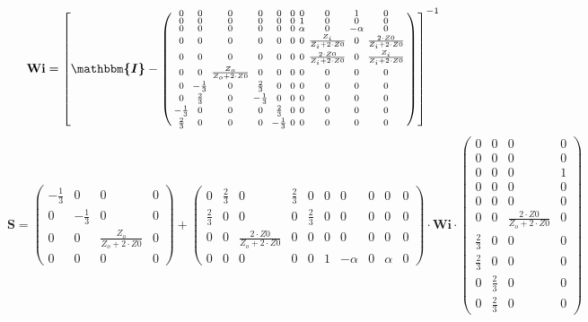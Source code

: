 \[ \mathbf{Wi} =  \left[ \boldsymbol{\mathbbm{I}}  -
\left(\begin{smallmatrix} 0 & 0 & 0 & 0 & 0 & 0 & 0 & 0 & 1 & 0 \\ 0 &
0 & 0 & 0 & 0 & 0 & 1 & 0 & 0 & 0 \\ 0 & 0 & 0 & 0 & 0 & 0 & \alpha &
0 & -\alpha & 0 \\ 0 & 0 & 0 & 0 & 0 & 0 & 0 & \frac{Z_i}{Z_i+2\cdot
Z0} & 0 & \frac{2\cdot Z0}{Z_i+2\cdot Z0} \\ 0 & 0 & 0 & 0 & 0 & 0 & 0
& \frac{2\cdot Z0}{Z_i+2\cdot Z0} & 0 & \frac{Z_i}{Z_i+2\cdot Z0} \\ 0
& 0 & \frac{Z_o}{Z_o+2\cdot Z0} & 0 & 0 & 0 & 0 & 0 & 0 & 0 \\ 0 &
-\frac{1}{3} & 0 & \frac{2}{3} & 0 & 0 & 0 & 0 & 0 & 0 \\ 0 &
\frac{2}{3} & 0 & -\frac{1}{3} & 0 & 0 & 0 & 0 & 0 & 0 \\ -\frac{1}{3}
& 0 & 0 & 0 & \frac{2}{3} & 0 & 0 & 0 & 0 & 0 \\ \frac{2}{3} & 0 & 0 &
0 & -\frac{1}{3} & 0 & 0 & 0 & 0 & 0 \end{smallmatrix}\right)
\right]^{-1}  \]
\[ \mathbf{S} = \left(\begin{smallmatrix} -\frac{1}{3} & 0 & 0 & 0 \\
0 & -\frac{1}{3} & 0 & 0 \\ 0 & 0 & \frac{Z_o}{Z_o+2\cdot Z0} & 0 \\ 0
& 0 & 0 & 0 \end{smallmatrix}\right) + \left(\begin{smallmatrix} 0 &
\frac{2}{3} & 0 & \frac{2}{3} & 0 & 0 & 0 & 0 & 0 & 0 \\ \frac{2}{3} &
0 & 0 & 0 & \frac{2}{3} & 0 & 0 & 0 & 0 & 0 \\ 0 & 0 & \frac{2\cdot
Z0}{Z_o+2\cdot Z0} & 0 & 0 & 0 & 0 & 0 & 0 & 0 \\ 0 & 0 & 0 & 0 & 0 &
1 & -\alpha & 0 & \alpha & 0 \end{smallmatrix}\right) \cdot
\mathbf{Wi} \cdot\left(\begin{smallmatrix} 0 & 0 & 0 & 0 \\ 0 & 0 & 0
& 0 \\ 0 & 0 & 0 & 1 \\ 0 & 0 & 0 & 0 \\ 0 & 0 & 0 & 0 \\ 0 & 0 &
\frac{2\cdot Z0}{Z_o+2\cdot Z0} & 0 \\ \frac{2}{3} & 0 & 0 & 0 \\
\frac{2}{3} & 0 & 0 & 0 \\ 0 & \frac{2}{3} & 0 & 0 \\ 0 & \frac{2}{3}
& 0 & 0 \end{smallmatrix}\right) \]
